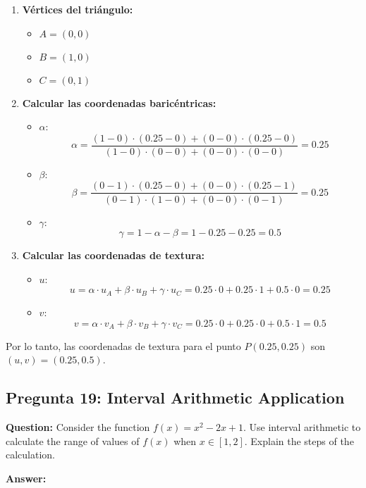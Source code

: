 \documentclass{article}
\begin{document}
\begin{enumerate}
    \item \textbf{Vértices del triángulo:}
    \begin{itemize}
        \item $A = (0, 0)$
        \item $B = (1, 0)$
        \item $C = (0, 1)$
    \end{itemize}
    \item \textbf{Calcular las coordenadas baricéntricas:}
    \begin{itemize}
        \item $\alpha$:
        \[
        \alpha = \frac{(1 - 0) \cdot (0.25 - 0) + (0 - 0) \cdot (0.25 - 0)}{(1 - 0) \cdot (0 - 0) + (0 - 0) \cdot (0 - 0)} = 0.25
        \]
        \item $\beta$:
        \[
        \beta = \frac{(0 - 1) \cdot (0.25 - 0) + (0 - 0) \cdot (0.25 - 1)}{(0 - 1) \cdot (1 - 0) + (0 - 0) \cdot (0 - 1)} = 0.25
        \]
        \item $\gamma$:
        \[
        \gamma = 1 - \alpha - \beta = 1 - 0.25 - 0.25 = 0.5
        \]
    \end{itemize}
    \item \textbf{Calcular las coordenadas de textura:}
    \begin{itemize}
        \item $u$:
        \[
        u = \alpha \cdot u_A + \beta \cdot u_B + \gamma \cdot u_C = 0.25 \cdot 0 + 0.25 \cdot 1 + 0.5 \cdot 0 = 0.25
        \]
        \item $v$:
        \[
        v = \alpha \cdot v_A + \beta \cdot v_B + \gamma \cdot v_C = 0.25 \cdot 0 + 0.25 \cdot 0 + 0.5 \cdot 1 = 0.5
        \]
    \end{itemize}
\end{enumerate}

Por lo tanto, las coordenadas de textura para el punto $P(0.25, 0.25)$ son $(u, v) = (0.25, 0.5)$.

\subsection{Pregunta 19: Interval Arithmetic Application}

\textbf{Question:} Consider the function $f(x) = x^2 - 2x + 1$. Use interval arithmetic to calculate the range of values of $f(x)$ when $x \in [1, 2]$. Explain the steps of the calculation.

\textbf{Answer:}
\end{document}
